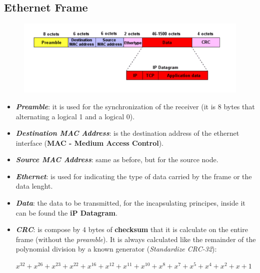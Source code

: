 \subsection{Ethernet Frame}
\begin{figure}[h]
    \centering
    \includegraphics[width=\textwidth]{img/eth_frame}
\end{figure}
\begin{itemize}[nosep]
    \item \textbf{\textit{Preamble}}: it is used for the synchronization of the receiver (it is 8 bytes that alternating a logical 1 and a logical 0).
    \item \textbf{\textit{Destination MAC Address}}: is the destination address of the ethernet interface (\textbf{MAC - Medium Access Control}).
    \item \textbf{\textit{Source MAC Address}}: same as before, but for the source node.
    \item \textbf{\textit{Ethernet}}: is used for indicating the type of data carried by the frame or the data lenght.
    \item \textbf{\textit{Data}}: the data to be transmitted, for the incapsulating principes, inside it can be found the \textbf{iP Datagram}.
    \item \textbf{\textit{CRC}}: is compose by 4 bytes of \textbf{checksum} that it is calculate on the entire frame (without the \textit{preamble}). It is always calculated like the remainder of the polynomial division by a known generator (\textit{Standardize CRC-32}):
    \begin{center}
        $x^{32} + x^{26} + x^{23} + x^{22} + x^{16} + x^{12} + x^{11} + x^{10} + x^8 + x^7 + x^5 + x^4 + x^2 + x + 1$
    \end{center}
\end{itemize}

